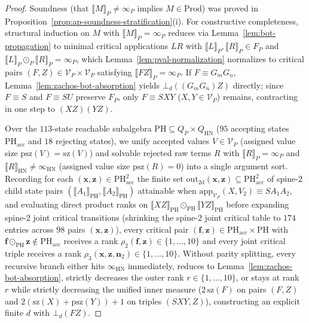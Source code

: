 \documentclass[11pt,reqno]{amsart}
\numberwithin{equation}{section}
\theoremstyle{plain}
\theoremstyle{definition}
\theoremstyle{remark}
\newcommand{\HN}{\mathrm{HN}}
\newcommand{\Prod}{\mathrm{Prod}}
\newcommand{\sem}[1]{\llbracket #1 \rrbracket}
\begin{document}
\begin{proof}
Soundness (that $\sem{M}_P \neq \infty_P$ implies $M \in \Prod$) was proved in Proposition~\ref{prop:ap-soundness-stratification}(i). For constructive completeness, structural induction on $M$ with $\sem{M}_P = \infty_P$ reduces via Lemma~\ref{lem:bot-propagation} to minimal critical applications $L R$ with $\sem{L}_P, \sem{R}_P \in F_P$ and $\sem{L}_P \odot_P \sem{R}_P = \infty_P$, which Lemma~\ref{lem:pval-normalization} normalizes to critical pairs $(F, Z) \in \mathcal{V}_P \times \mathcal{V}_P$ satisfying $\sem{F Z}_P = \infty_P$. If $F \equiv G_m G_n$, Lemma~\ref{lem:zachos-bot-absorption} yields $\bot_d((G_m G_n) Z)$ directly; since $F \equiv S$ and $F \equiv S U$ preserve $F_P$, only $F \equiv S X Y$ ($X, Y \in \mathcal{V}_P$) remains, contracting in one step to $(X Z)(Y Z)$.

Over the $113$-state reachable subalgebra $\mathrm{PH} \subseteq Q_P \times Q_{\HN}$ ($95$ accepting states $\mathrm{PH}_{\mathrm{acc}}$ and $18$ rejecting states), we unify accepted values $V \in \mathcal{V}_P$ (assigned value size $\mathrm{psz}(V) = \mathrm{sz}(V)$) and solvable rejected raw terms $R$ with $\sem{R}_P = \infty_P$ and $\sem{R}_{\HN} \neq \infty_{\HN}$ (assigned value size $\mathrm{psz}(R) = 0$) into a single argument sort. Recording for each $(\mathbf{x}, \mathbf{z}) \in \mathrm{PH}_{\mathrm{acc}}^2$ the finite set $\mathrm{out}_{2\mathrm{d}}(\mathbf{x}, \mathbf{z}) \subseteq \mathrm{PH}_{\mathrm{acc}}^2$ of spine-$2$ child state pairs $(\sem{A_1}_{\mathrm{PH}}, \sem{A_2}_{\mathrm{PH}})$ attainable when $\mathrm{app}_{\mathcal{V}_P}(X, V_2) \equiv S A_1 A_2$, and evaluating direct product ranks on $\sem{X Z}_{\mathrm{PH}} \odot_{\mathrm{PH}} \sem{Y Z}_{\mathrm{PH}}$ before expanding spine-$2$ joint critical transitions (shrinking the spine-$2$ joint critical table to $174$ entries across $98$ pairs $(\mathbf{x}, \mathbf{z})$), every critical pair $(\mathbf{f}, \mathbf{z}) \in \mathrm{PH}_{\mathrm{acc}} \times \mathrm{PH}$ with $\mathbf{f} \odot_{\mathrm{PH}} \mathbf{z} \notin \mathrm{PH}_{\mathrm{acc}}$ receives a rank $\rho_2(\mathbf{f}, \mathbf{z}) \in \{1, \dots, 10\}$ and every joint critical triple receives a rank $\rho_3(\mathbf{x}, \mathbf{z}, \mathbf{n}_2) \in \{1, \dots, 10\}$. Without parity splitting, every recursive branch either hits $\infty_{\HN}$ immediately, reduces to Lemma~\ref{lem:zachos-bot-absorption}, strictly decreases the outer rank $r \in \{1, \dots, 10\}$, or stays at rank~$r$ while strictly decreasing the unified inner measure ($2\,\mathrm{sz}(F)$ on pairs $(F, Z)$ and $2(\mathrm{sz}(X) + \mathrm{psz}(Y)) + 1$ on triples $(S X Y, Z)$), constructing an explicit finite $d$ with $\bot_d(F Z)$.
\end{proof}
\end{document}
